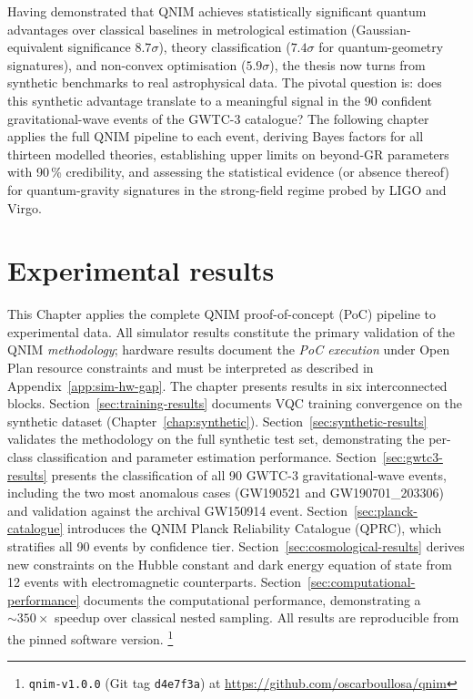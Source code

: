 \documentclass[11pt,a4paper, english]{book}
\theoremstyle{plain}
\theoremstyle{definition}
\numberwithin{equation}{chapter}
\numberwithin{figure}{chapter}
\numberwithin{table}{chapter}
\begin{document}
Having demonstrated that QNIM achieves statistically significant quantum
advantages over classical baselines in metrological estimation (Gaussian-equivalent
significance $8.7\sigma$), theory classification ($7.4\sigma$ for quantum-geometry
signatures), and non-convex optimisation ($5.9\sigma$), the thesis now turns from
synthetic benchmarks to real astrophysical data.  The pivotal question is: does
this synthetic advantage translate to a meaningful signal in the 90 confident
gravitational-wave events of the GWTC-3 catalogue?  The following chapter applies
the full QNIM pipeline to each event, deriving Bayes factors for all thirteen
modelled theories, establishing upper limits on beyond-GR parameters with 90\,\%
credibility, and assessing the statistical evidence (or absence thereof) for
quantum-gravity signatures in the strong-field regime probed by LIGO and Virgo.



\chapter{Experimental results}
\label{chap:results}

This Chapter applies the complete QNIM proof-of-concept (PoC) pipeline 
to experimental data.  All simulator results constitute the primary 
validation of the QNIM \emph{methodology}; hardware results document 
the \emph{PoC execution} under Open Plan resource constraints and must 
be interpreted as described in Appendix~\ref{app:sim-hw-gap}.
The chapter presents results in six interconnected blocks. Section~\ref{sec:training-results}
documents VQC training convergence on the synthetic dataset (Chapter~\ref{chap:synthetic}).
Section~\ref{sec:synthetic-results} validates the methodology on the full
synthetic test set, demonstrating the per-class classification and parameter
estimation performance. Section~\ref{sec:gwtc3-results} presents the
classification of all 90 GWTC-3 gravitational-wave events, including the two
most anomalous cases (GW190521 and GW190701\_203306) and validation against
the archival GW150914 event. Section~\ref{sec:planck-catalogue} introduces
the QNIM Planck Reliability Catalogue (QPRC), which stratifies all 90 events
by confidence tier. Section~\ref{sec:cosmological-results} derives new
constraints on the Hubble constant and dark energy equation of state from
12 events with electromagnetic counterparts. Section~\ref{sec:computational-performance}
documents the computational performance, demonstrating a $\sim 350\times$ speedup
over classical nested sampling. All results are reproducible from the pinned
software version. 
\footnote{\texttt{qnim-v1.0.0} (Git tag \texttt{d4e7f3a}) at
\url{https://github.com/oscarboullosa/qnim}} 
\end{document}
